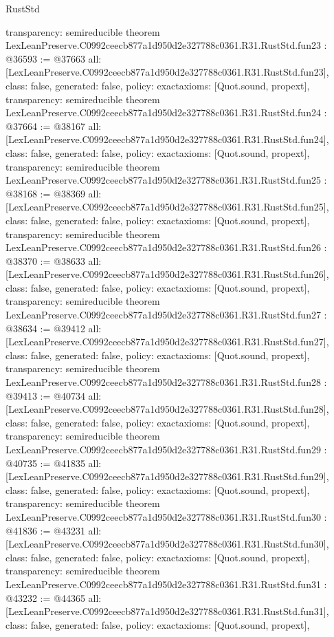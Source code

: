 \begin{lexlean}{RustStd}
\begin{coremodule}
{  transparency: semireducible
}
theorem LexLeanPreserve.C0992ceecb877a1d950d2e327788c0361.R31.RustStd.fun23 : @36593 := @37663 {
  all: [LexLeanPreserve.C0992ceecb877a1d950d2e327788c0361.R31.RustStd.fun23],
  class: false,
  generated: false,
  policy: exact{axioms: [Quot.sound, propext]},
  transparency: semireducible
}
theorem LexLeanPreserve.C0992ceecb877a1d950d2e327788c0361.R31.RustStd.fun24 : @37664 := @38167 {
  all: [LexLeanPreserve.C0992ceecb877a1d950d2e327788c0361.R31.RustStd.fun24],
  class: false,
  generated: false,
  policy: exact{axioms: [Quot.sound, propext]},
  transparency: semireducible
}
theorem LexLeanPreserve.C0992ceecb877a1d950d2e327788c0361.R31.RustStd.fun25 : @38168 := @38369 {
  all: [LexLeanPreserve.C0992ceecb877a1d950d2e327788c0361.R31.RustStd.fun25],
  class: false,
  generated: false,
  policy: exact{axioms: [Quot.sound, propext]},
  transparency: semireducible
}
theorem LexLeanPreserve.C0992ceecb877a1d950d2e327788c0361.R31.RustStd.fun26 : @38370 := @38633 {
  all: [LexLeanPreserve.C0992ceecb877a1d950d2e327788c0361.R31.RustStd.fun26],
  class: false,
  generated: false,
  policy: exact{axioms: [Quot.sound, propext]},
  transparency: semireducible
}
theorem LexLeanPreserve.C0992ceecb877a1d950d2e327788c0361.R31.RustStd.fun27 : @38634 := @39412 {
  all: [LexLeanPreserve.C0992ceecb877a1d950d2e327788c0361.R31.RustStd.fun27],
  class: false,
  generated: false,
  policy: exact{axioms: [Quot.sound, propext]},
  transparency: semireducible
}
theorem LexLeanPreserve.C0992ceecb877a1d950d2e327788c0361.R31.RustStd.fun28 : @39413 := @40734 {
  all: [LexLeanPreserve.C0992ceecb877a1d950d2e327788c0361.R31.RustStd.fun28],
  class: false,
  generated: false,
  policy: exact{axioms: [Quot.sound, propext]},
  transparency: semireducible
}
theorem LexLeanPreserve.C0992ceecb877a1d950d2e327788c0361.R31.RustStd.fun29 : @40735 := @41835 {
  all: [LexLeanPreserve.C0992ceecb877a1d950d2e327788c0361.R31.RustStd.fun29],
  class: false,
  generated: false,
  policy: exact{axioms: [Quot.sound, propext]},
  transparency: semireducible
}
theorem LexLeanPreserve.C0992ceecb877a1d950d2e327788c0361.R31.RustStd.fun30 : @41836 := @43231 {
  all: [LexLeanPreserve.C0992ceecb877a1d950d2e327788c0361.R31.RustStd.fun30],
  class: false,
  generated: false,
  policy: exact{axioms: [Quot.sound, propext]},
  transparency: semireducible
}
theorem LexLeanPreserve.C0992ceecb877a1d950d2e327788c0361.R31.RustStd.fun31 : @43232 := @44365 {
  all: [LexLeanPreserve.C0992ceecb877a1d950d2e327788c0361.R31.RustStd.fun31],
  class: false,
  generated: false,
  policy: exact{axioms: [Quot.sound, propext]},
}
\end{coremodule}
\end{lexlean}
